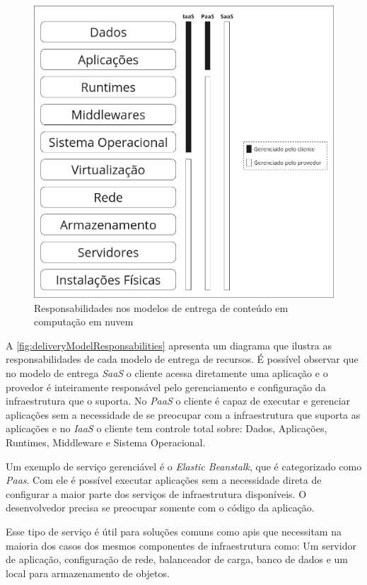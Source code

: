 \begin{figure}[H]
\captionsetup{width=.7\textwidth}%
\caption{Responsabilidades nos modelos de entrega de conteúdo em computação em nuvem}
\label{fig:deliveryModelResponsabilities}
\includegraphics[width=.7\textwidth]{capitulos/1-revisao-da-literatura/files/delivery-model-2.png}
\end{figure}

A \autoref{fig:deliveryModelResponsabilities} apresenta um diagrama que ilustra as responsabilidades de cada modelo de entrega de recursos. É possível observar que no modelo de entrega \textit{SaaS} o cliente acessa diretamente uma aplicação e o provedor é inteiramente responsável pelo gerenciamento e configuração da infraestrutura que o suporta. No \textit{PaaS} o cliente é capaz de executar e gerenciar aplicações sem a necessidade de se preocupar com a infraestrutura que suporta as aplicações e no \textit{IaaS} o cliente tem controle total sobre: Dados, Aplicações, Runtimes, Middleware e Sistema Operacional. \citep{cloudcomputingcambridge}

Um exemplo de serviço gerenciável é o \textit{Elastic Beanstalk}, que é categorizado como \textit{Paas}. Com ele é possível executar aplicações sem a necessidade direta de configurar a maior parte dos serviços de infraestrutura disponíveis. O desenvolvedor precisa se preocupar somente com o código da aplicação.

Esse tipo de serviço é útil para soluções comuns como \glspl{api} que necessitam na maioria dos casos dos mesmos componentes de infraestrutura como: Um servidor de aplicação, configuração de rede, balanceador de carga, banco de dados e um local para armazenamento de objetos.

